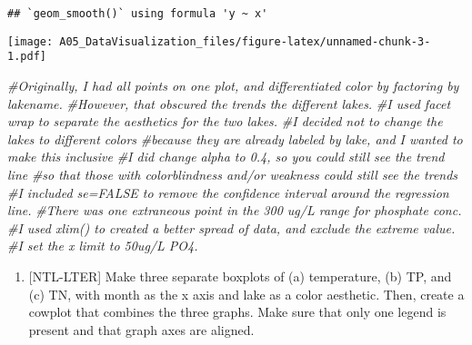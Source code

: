 \documentclass[
]{article}
\newenvironment{Shaded}{\begin{snugshade}}{\end{snugshade}}
\newcommand{\CommentTok}[1]{\textcolor[rgb]{0.56,0.35,0.01}{\textit{#1}}}
\providecommand{\tightlist}{%
  \setlength{\itemsep}{0pt}\setlength{\parskip}{0pt}}
\begin{document}
\begin{verbatim}
## `geom_smooth()` using formula 'y ~ x'
\end{verbatim}

\texttt{[image: A05\_DataVisualization\_files/figure-latex/unnamed-chunk-3-1.pdf]}

\begin{Shaded}
\begin{Highlighting}[]
\CommentTok{\#Originally, I had all points on one plot, and differentiated color by factoring by lakename. }
\CommentTok{\#However, that obscured the trends the different lakes. }
\CommentTok{\#I used facet wrap to separate the aesthetics for the two lakes.}
\CommentTok{\#I decided not to change the lakes to different colors }
\CommentTok{\#because they are already labeled by lake, and I wanted to make this inclusive }
\CommentTok{\#I did change alpha to 0.4, so you could still see the trend line }
\CommentTok{\#so that those with colorblindness and/or weakness could still see the trends}
\CommentTok{\#I included se=FALSE to remove the confidence interval around the regression line.}
\CommentTok{\#There was one extraneous point in the 300 ug/L range for phosphate conc.}
\CommentTok{\#I used xlim() to created a better spread of data, and exclude the extreme value.}
\CommentTok{\#I set the x limit to 50ug/L PO4.}
\end{Highlighting}
\end{Shaded}

\begin{enumerate}
\def\labelenumi{\arabic{enumi}.}
\setcounter{enumi}{4}
\tightlist
\item
  {[}NTL-LTER{]} Make three separate boxplots of (a) temperature, (b)
  TP, and (c) TN, with month as the x axis and lake as a color
  aesthetic. Then, create a cowplot that combines the three graphs. Make
  sure that only one legend is present and that graph axes are aligned.
\end{enumerate}
\end{document}
